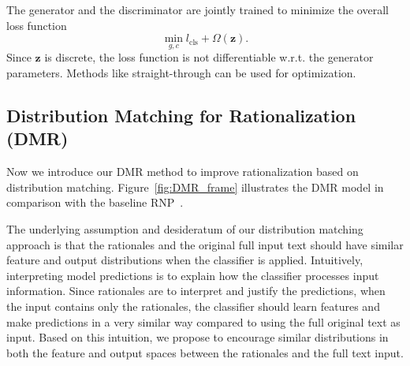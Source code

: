 \documentclass[letterpaper]{article} %
\begin{document}
The generator and the discriminator are jointly trained to minimize the overall loss function
\[
\min_{g, c} l_\text{cls} + \Omega(\mathbf{z}).
\]
Since $\mathbf{z}$ is discrete, the loss function is not differentiable w.r.t. the generator parameters. Methods like straight-through \cite{Bengio2013EstimatingOP} can be used for optimization.




\subsection{Distribution Matching for Rationalization (DMR)}

Now we introduce our DMR method to improve rationalization based on distribution matching. Figure~\ref{fig:DMR_frame} illustrates the DMR model in comparison with the baseline RNP~\cite{lei2016rationalizing}. 

The underlying assumption and desideratum of our distribution matching approach is that the rationales and the original full input text should have similar feature and output distributions when the classifier is applied. Intuitively, interpreting model predictions is to explain how the classifier processes input information. Since rationales are to interpret and justify the predictions, when the input contains only the rationales, the classifier should learn features and make predictions in a very similar way compared to using the full original text as input. Based on this intuition, we propose to encourage similar distributions in both the feature and output spaces between the rationales and the full text input.
\end{document}
